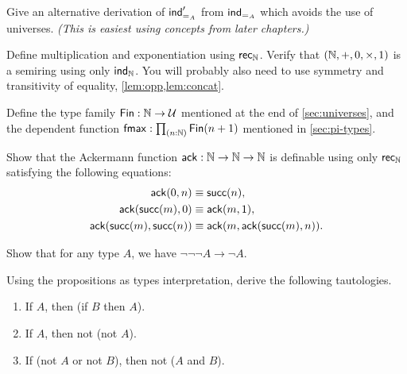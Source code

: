 \begin{ex}\label{ex:pm-to-ml}
Give an alternative derivation of $\mathsf{ind}_{=_{A}}'$ from $\mathsf{ind}_{=_{A}}$ which avoids the use of universes.
\emph{(This is easiest using concepts from later chapters.)}
\end{ex}

\begin{ex}\label{ex:nat-semiring}
%
Define multiplication and exponentiation using $\mathsf{rec}_{\mathbb{N}}$.
Verify that $(\mathbb{N},+,0,\times,1)$ is a semiring using only $\mathsf{ind}_{\mathbb{N}}$.
You will probably also need to use symmetry and transitivity of equality, \cref{lem:opp,lem:concat}.
\end{ex}

\begin{ex}\label{ex:fin}
%
Define the type family $\mathsf{Fin} : \mathbb{N} \to \mathcal{U}$ mentioned at the end of \cref{sec:universes}, and the dependent function $\fmax : \prd{n:\nat} \Fin(n+1)$ mentioned in \cref{sec:pi-types}.
\end{ex}

\begin{ex}\label{ex:ackermann}
%
%
Show that the Ackermann function $\mathsf{ack} : \mathbb{N} \to \mathbb{N} \to \mathbb{N}$ is definable using only $\mathsf{rec}_{\mathbb{N}}$ satisfying the following equations:
\begin{align*}
    \mathsf{ack}(0,n) &\equiv \mathsf{succ}(n), \\
    \mathsf{ack}(\mathsf{succ}(m),0) &\equiv \mathsf{ack}(m,1), \\
    \mathsf{ack}(\mathsf{succ}(m),\mathsf{succ}(n)) &\equiv \mathsf{ack}(m,\mathsf{ack}(\mathsf{succ}(m),n)).
\end{align*}
\end{ex}

\begin{ex}\label{ex:neg-ldn}
Show that for any type $A$, we have $\neg\neg\neg A \to \neg A$.
\end{ex}

\begin{ex}\label{ex:tautologies}
Using the propositions as types interpretation, derive the following tautologies.
\begin{enumerate}
    \item If $A$, then (if $B$ then $A$).
    \item If $A$, then not (not $A$).
    \item If (not $A$ or not $B$), then not ($A$ and $B$).
\end{enumerate}
\end{ex}

